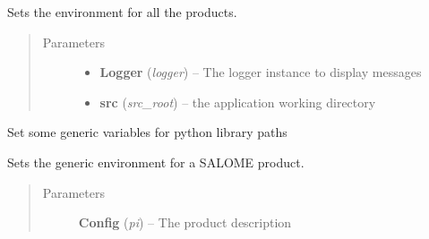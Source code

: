 \documentclass[a4paper,10pt,english]{sphinxmanual}
\begin{document}
\begin{fulllineitems}
\begin{fulllineitems}
\begin{quote}
\begin{description}
\begin{itemize}
\end{itemize}

\end{description}\end{quote}

\end{fulllineitems}


\begin{fulllineitems}
\label{commands/apidoc/src:src.environment.SalomeEnviron.set_products}
Sets the environment for all the products.
\begin{quote}\begin{description}
\item[{Parameters}] \leavevmode\begin{itemize}
\item {} 
\textbf{Logger} (\emph{logger}) -- The logger instance to display messages

\item {} 
\textbf{src} (\emph{src\_root}) -- the application working directory

\end{itemize}

\end{description}\end{quote}

\end{fulllineitems}


\begin{fulllineitems}
\label{commands/apidoc/src:src.environment.SalomeEnviron.set_python_libdirs}
Set some generic variables for python library paths

\end{fulllineitems}


\begin{fulllineitems}
\label{commands/apidoc/src:src.environment.SalomeEnviron.set_salome_generic_product_env}
Sets the generic environment for a SALOME product.
\begin{quote}\begin{description}
\item[{Parameters}] \leavevmode
\textbf{Config} (\emph{pi}) -- The product description


\end{description}
\end{quote}
\end{fulllineitems}
\end{fulllineitems}
\end{document}

